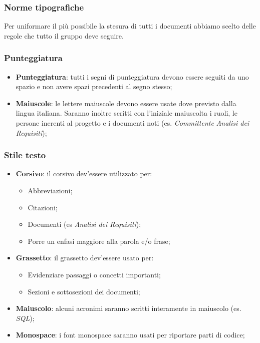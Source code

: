\documentclass{scalatekids-article}
\begin{document}
\subsubsection{Norme tipografiche}
Per uniformare il più possibile la stesura di tutti i documenti abbiamo scelto delle regole che tutto il gruppo deve seguire.

\subsubsection{Punteggiatura}
\begin{itemize}
\item \textbf{Punteggiatura}: tutti i segni di punteggiatura devono essere seguiti da uno spazio e non avere spazi precedenti al segno stesso;
\item \textbf{Maiuscole}: le lettere maiuscole devono essere usate dove previsto dalla lingua italiana.
  Saranno inoltre scritti con l'iniziale maiuscolta i ruoli, le persone inerenti al progetto e i documenti noti (es. \textit{Committente} \textit{Analisi dei Requisiti});
\end{itemize}

\subsubsection{Stile testo}
\begin{itemize}
\item \textbf{Corsivo}: il corsivo dev'essere utilizzato per:
  \begin{itemize}
  \item Abbreviazioni;
  \item Citazioni;
  \item Documenti (es \textit{Analisi dei Requisiti});
  \item Porre un enfasi maggiore alla parola e/o frase;
  \end{itemize}
\item \textbf{Grassetto}: il grassetto dev'essere usato per:
  \begin{itemize}
  \item Evidenziare passaggi o concetti importanti;
  \item Sezioni e sottosezioni dei documenti;
  \end{itemize}
\item \textbf{Maiuscolo}: alcuni acronimi saranno scritti interamente in maiuscolo (es. \textit{SQL});
\item \textbf{Monospace}: i font monospace saranno usati per riportare parti di codice;
\end{itemize}
\end{document}
